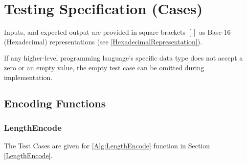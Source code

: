 \documentclass[../alan-handbook.tex]{subfiles}
\begin{document}
\section{Testing Specification (Cases)} \label{TestingSpec}

Inputs, and expected output are provided in square brackets $[ ]$ as Base-16 (Hexadecimal) representations (see \ref{HexadecimalRepresentation}).

If any higher-level programming language's specific data type does not accept a zero or an empty value, the empty test case can be omitted during implementation.

\subsection{Encoding Functions} \label{EncodingTestsSpec}

\subsubsection{LengthEncode} \label{Test:LengthEncode}

The Test Cases are given for  \ref{Alg:LengthEncode} function in Section \ref{LengthEncode}.
\end{document}
